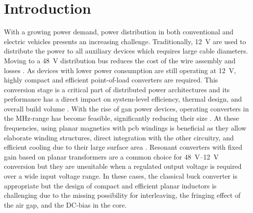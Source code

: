 \documentclass[a4paper]{IPEC2026}
\newcommand{\ac}{\gls}
\begin{document}
\section{Introduction}
With a growing power demand, power distribution in both conventional and electric vehicles presents an increasing challenge. Traditionally, \qty{12}{\V} are used to distribute the power to all auxiliary devices which requires large cable diameters. Moving to a \qty{48}{\V} distribution bus reduces the cost of the wire assembly and losses \cite{kumawatComprehensiveStudyAutomotive2019}. As devices with lower power consumption are still operating at \qty{12}{\V}, highly compact and efficient point-of-load converters are required. This conversion stage is a critical part of distributed power architectures and its performance has a direct impact on system-level efficiency, thermal design, and overall build volume \cite{kumawatComprehensiveStudyAutomotive2019}. With the rise of \ac{gan} power devices, operating converters in the MHz-range has become feasible, significantly reducing their size \cite{weitzHighFrequencyResonant2023}. 
At these frequencies, using planar magnetics with \ac{pcb} windings is beneficial as they allow elaborate winding structures, direct integration with the other circuitry, and efficient cooling due to their large surface area \cite{wangPCBWindingBasedCoupled2023, liHighFrequencyHigh2018, schaferNovelHighlyEfficient2020, caiOptimalDesignMegahertz2020}. 
Resonant converters with fixed gain based on planar transformers are a common choice for \qtyrange{48}{12}{\V} conversion but they are unsuitable when a regulated output voltage is required over a wide input voltage range. In these cases, the classical buck converter is appropriate but the design of compact and efficient planar inductors is challenging due to the missing possibility for interleaving, the fringing effect of the air gap, and the DC-bias in the core. \par
\end{document}
